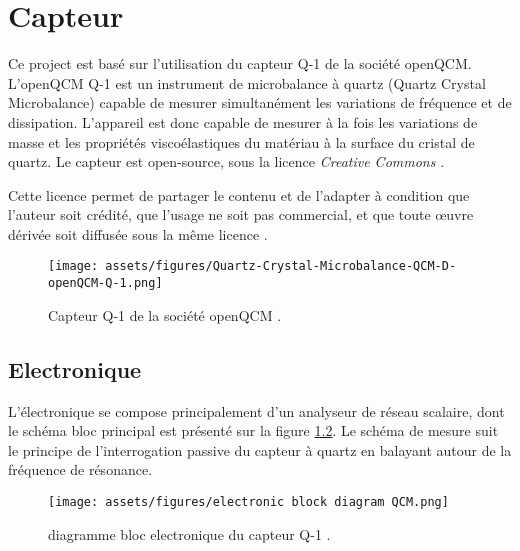 \chapter{Capteur}

Ce project est basé sur l'utilisation du capteur Q-1 de la société openQCM.
L’openQCM Q-1 est un instrument de microbalance à quartz (Quartz Crystal Microbalance) capable de mesurer simultanément les variations de fréquence et de dissipation. 
L’appareil est donc capable de mesurer à la fois les variations de masse et les propriétés viscoélastiques du matériau à la surface du cristal de quartz.
Le capteur est open-source, sous la licence \textit{Creative Commons} \cite{manual-openqcmQ1}.

Cette licence permet de partager le contenu et de l’adapter à condition que l’auteur soit crédité, que l’usage ne soit pas commercial, 
et que toute œuvre dérivée soit diffusée sous la même licence \cite{cc-by-nc-sa-4.0}.

\begin{figure}[H]
    \centering
    \texttt{[image: assets/figures/Quartz-Crystal-Microbalance-QCM-D-openQCM-Q-1.png]}
    \caption{Capteur Q-1 de la société openQCM \cite{manual-openqcmQ1}.}
    \label{fig:Q-1}
\end{figure}

\section{Electronique}
L’électronique se compose principalement d’un analyseur de réseau scalaire, dont le schéma bloc principal est présenté sur la figure \ref{fig:bloc diagram Q-1}. Le schéma de mesure suit le principe de l’interrogation passive du capteur à quartz en balayant autour de la fréquence de résonance.

\begin{figure}[H]
    \centering
    \texttt{[image: assets/figures/electronic block diagram QCM.png]}
    \caption{diagramme bloc electronique du capteur Q-1 \cite{manual-openqcmQ1}.}
    \label{fig:bloc diagram Q-1}
\end{figure}

